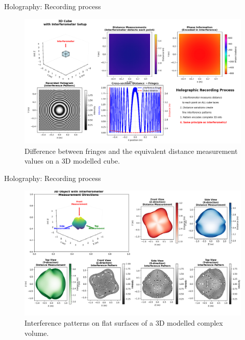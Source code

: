 \documentclass{beamer}
\begin{document}
\begin{frame}{Holography: Recording process}
    \begin{figure}[h]
        \centering
        \includegraphics[width=1\textwidth]{Figures/cube-fringe-distances.png}
        \caption{Difference between fringes and the equivalent distance measurement values on a 3D modelled cube.}
        \label{fig:cube_fringes}
    \end{figure}
\end{frame}
\begin{frame}{Holography: Recording process}
    \begin{figure}[h]
        \centering
        \includegraphics[width=1\textwidth]{Figures/sphere-holograph.png}
        \caption{Interference patterns on flat surfaces of a 3D modelled complex volume.}
        \label{fig:sphere_holograph}
    \end{figure}
\end{frame}
\end{document}
